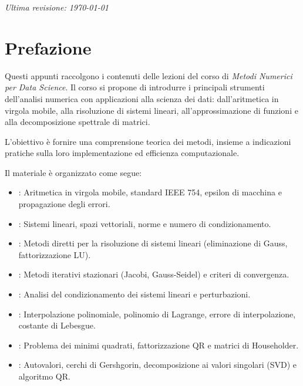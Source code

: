 \documentclass[12pt, a4paper, twoside]{book}
\theoremstyle{plain}
\theoremstyle{definition}
\begin{document}
\vspace{1cm}
\noindent
\textit{Ultima revisione: \today}
\newpage

\tableofcontents
\newpage

\chapter*{Prefazione}

Questi appunti raccolgono i contenuti delle lezioni del corso di \emph{Metodi Numerici
per Data Science}. Il corso si propone di introdurre i principali strumenti dell'analisi
numerica con applicazioni alla scienza dei dati: dall'aritmetica in virgola mobile, alla
risoluzione di sistemi lineari, all'approssimazione di funzioni e alla decomposizione
spettrale di matrici.

\medskip
L'obiettivo è fornire una comprensione teorica dei metodi, insieme a indicazioni
pratiche sulla loro implementazione ed efficienza computazionale.

\medskip
Il materiale è organizzato come segue:
\begin{itemize}
  \item \textbf{}: Aritmetica in virgola mobile, standard IEEE 754,
        epsilon di macchina e propagazione degli errori.
  \item \textbf{}: Sistemi lineari, spazi vettoriali, norme e numero
        di condizionamento.
  \item \textbf{}: Metodi diretti per la risoluzione di sistemi
        lineari (eliminazione di Gauss, fattorizzazione LU).
  \item \textbf{}: Metodi iterativi stazionari (Jacobi,
        Gauss-Seidel) e criteri di convergenza.
  \item \textbf{}: Analisi del condizionamento dei sistemi
        lineari e perturbazioni.
  \item \textbf{}: Interpolazione polinomiale, polinomio di
        Lagrange, errore di interpolazione, costante di Lebesgue.
  \item \textbf{}: Problema dei minimi quadrati,
        fattorizzazione QR e matrici di Householder.
  \item \textbf{}: Autovalori, cerchi di Gershgorin,
        decomposizione ai valori singolari (SVD) e algoritmo QR.
\end{itemize}
\end{document}
